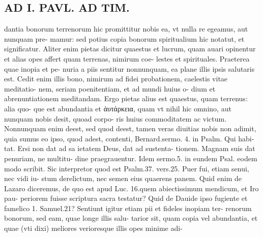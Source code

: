 \documentclass{article}
\begin{document}
\begin{pages}
\section*{AD I. PAVL. AD TIM. }
\marginpar{[ p.430 ]}\pstart dantia bonorum terrenorum hic promittitur nobis ea, vt nulla re egeamus, aut nunquam pre- mamur: sed potius copia bonorum spiritualium hic notatut, et significatur. Aliter enim pietas dicitur quaestus et lucrum, quam auari opinentur et alias opes affert quam terrenas, nimirum coe- lestes et spirituales. Praeterea quae inopia et pe- nuria a piis sentitur nonnunquam, ea plane illis ipsis salutaris est. Cedit enim illis bono, nimirum ad fidei probationem, caelestis vitae meditatio- nem, seriam poenitentiam, et ad mundi huius o- dium et abrenuntiationem meditandam. Ergo pietas alius est quaestus, quam terrenus: alia quo- que est abundantia et ἀυτάρκεια, quam vt nihil hic omnino, aut nunquam nobis desit, quoad corpo- ris huius commoditatem ac victum. Nonnunquam enim deest, sed quod deest, tamen veras diuitias nobis non adimit, quia sumus eo ipso, quod adest, contenti, Bernard.sermo. 4. in Psalm. Qui habi- tat. Ersi non dat ad sa ietatem Deus, dat ad sustenta- tionem. Magnam suis dat penuriam, ne multitu- dine praegrauentur. Idem sermo.5. in eundem Psal. eodem modo scribit. Sic interpretor quod est Psalm.37. vers.25. Puer fui, etiam senui, nec vidi iu- stum derelictum, nec semen eius quaerens panem. Quid enim de Lazaro diceremus, de quo est apud Luc. 16.quem abiectissimum mendicum, et Iro pau- periorem fuisse scriptura sacra testatur? Quid de Dauide ipso fugiente et famelico 1. Samuel.21? Sentiunt igitur etiam pii et fideles inopiam ter- renorum bonorum, sed eam, quae longe illis salu- tarior sit, quam copia vel abundantia, et quae (vti dixi) meliores verioresque illis opes minime adi-  \pend

\end{pages}
\end{document}
